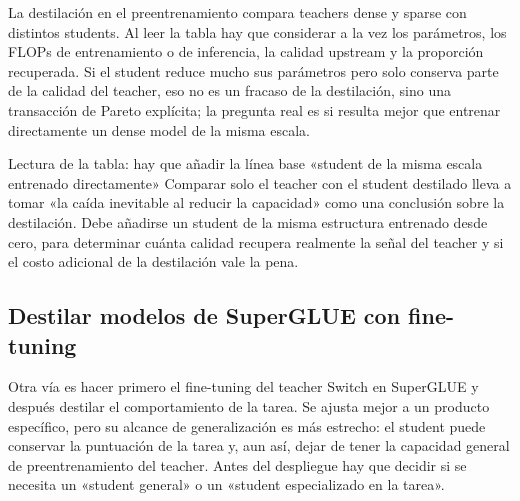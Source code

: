 La destilación en el preentrenamiento compara teachers dense y sparse con distintos students. Al leer la tabla hay que considerar a la vez los parámetros, los FLOPs de entrenamiento o de inferencia, la calidad upstream y la proporción recuperada. Si el student reduce mucho sus parámetros pero solo conserva parte de la calidad del teacher, eso no es un fracaso de la destilación, sino una transacción de Pareto explícita; la pregunta real es si resulta mejor que entrenar directamente un dense model de la misma escala.


\begin{knowledgebox}{Lectura de la tabla: hay que añadir la línea base «student de la misma escala entrenado directamente»}
Comparar solo el teacher con el student destilado lleva a tomar «la caída inevitable al reducir la capacidad» como una conclusión sobre la destilación. Debe añadirse un student de la misma estructura entrenado desde cero, para determinar cuánta calidad recupera realmente la señal del teacher y si el costo adicional de la destilación vale la pena.
\end{knowledgebox}


\subsection{Destilar modelos de SuperGLUE con fine-tuning}

Otra vía es hacer primero el fine-tuning del teacher Switch en SuperGLUE y después destilar el comportamiento de la tarea. Se ajusta mejor a un producto específico, pero su alcance de generalización es más estrecho: el student puede conservar la puntuación de la tarea y, aun así, dejar de tener la capacidad general de preentrenamiento del teacher. Antes del despliegue hay que decidir si se necesita un «student general» o un «student especializado en la tarea».

